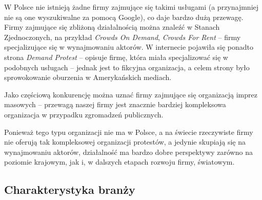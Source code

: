 \documentclass{article}
\begin{document}
W Polsce nie istnieją żadne firmy zajmujące się takimi usługami (a przynajmniej nie są one wyszukiwalne za pomocą Google), co daje bardzo dużą przewagę. Firmy zajmujące się zbliżoną działalnością można znaleźć w Stanach Zjednoczonych, na przykład \textit{Crowds On Demand}, \textit{Crowds For Rent} -- firmy specjalizujące się w wynajmowaniu aktorów. W internecie pojawiła się ponadto strona \textit{Demand Protest} -- opisuje firmę, która miała specjalizować się w podobnych usługach -- jednak jest to fikcyjna organizacja, a celem strony było sprowokowanie oburzenia w Amerykańskich mediach. 

Jako częściową konkurencję można uznać firmy zajmujące się organizacją imprez masowych -- przewagą naszej firmy jest znacznie bardziej kompleksowa organizacja w przypadku zgromadzeń publicznych.

Ponieważ tego typu organizacji nie ma w Polsce, a na świecie rzeczywiste firmy nie oferują tak kompleksowej organizacji protestów, a jedynie skupiają się na wynajmowaniu aktorów, działalność ma bardzo dobre perspektywy zarówno na poziomie krajowym, jak i, w dalszych etapach rozwoju firmy, światowym. 

\subsection{Charakterystyka branży}
\end{document}
